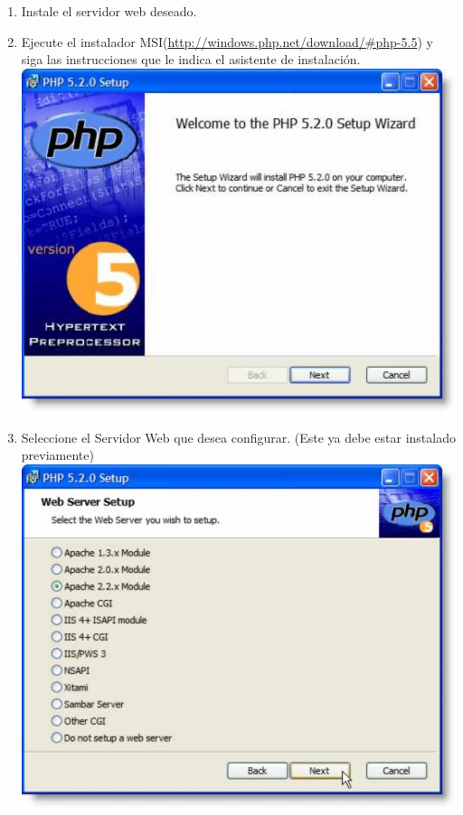 \documentclass[11pt]{article} %
\begin{document}
\begin{enumerate}
\item Instale el servidor web deseado.

\item Ejecute el instalador MSI(\url{http://windows.php.net/download/#php-5.5}) y siga las instrucciones que le indica el asistente de instalación.\\
\includegraphics{Imagenes/install01.jpg}

\item Seleccione el Servidor Web que desea configurar. (Este ya debe estar instalado previamente)\\
\includegraphics{Imagenes/install02.jpg}


\end{enumerate}
\end{document}
